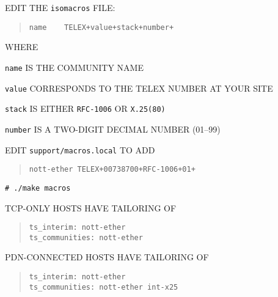 \begin{bwslide}

\begin{nrtc}
\item	EDIT THE \verb"isomacros" FILE:
\begin{quote}\small\begin{verbatim}
name    TELEX+value+stack+number+
\end{verbatim}\end{quote}
WHERE
    \begin{nrtc}
    \item	\verb"name" IS THE COMMUNITY NAME

    \item	\verb"value" CORRESPONDS TO THE TELEX NUMBER AT YOUR SITE

    \item	\verb"stack" IS EITHER \verb"RFC-1006" OR \verb"X.25(80)"

    \item	\verb"number" IS A TWO-DIGIT DECIMAL NUMBER (01--99)
    \end{nrtc}
\end{nrtc}
\end{bwslide}


\begin{bwslide}

\begin{nrtc}
\item	EDIT \verb"support/macros.local" TO ADD
\begin{quote}\small\begin{verbatim}
nott-ether TELEX+00738700+RFC-1006+01+
\end{verbatim}\end{quote}

\item	\verb"# ./make macros"

\item	TCP-ONLY HOSTS HAVE TAILORING OF
\begin{quote}\small\begin{verbatim}
ts_interim: nott-ether
ts_communities: nott-ether
\end{verbatim}\end{quote}

\item	PDN-CONNECTED HOSTS HAVE TAILORING OF
\begin{quote}\small\begin{verbatim}
ts_interim: nott-ether
ts_communities: nott-ether int-x25
\end{verbatim}\end{quote}
\end{nrtc}
\end{bwslide}


